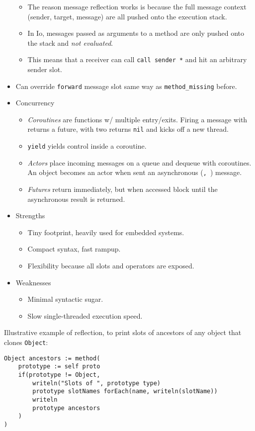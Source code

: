 \documentclass[10pt, twocolumn, landscape]{article}
\begin{document}
\begin{itemize}
\begin{itemize}
            \item The reason message reflection works is because the full
                message context (sender, target, message) are all pushed onto
                the execution stack.
            \item In Io, messages passed as arguments to a method are only
                pushed onto the stack and \emph{not evaluated}.
            \item This means that a receiver can call \texttt{call sender *} and
                hit an arbitrary sender slot.
        \end{itemize}
    \item Can override \texttt{forward} message slot same way as
        \texttt{method\_missing} before.
    \item Concurrency
        \begin{itemize}
            \item \emph{Coroutines} are functions w/ multiple entry/exits. Firing a
                message with \texttt{\@} returns a future, with two
                \texttt{\@\@} returns \texttt{nil} and kicks off a new thread.
            \item \texttt{yield} yields control inside a coroutine.
            \item \emph{Actors} place incoming messages on a queue and dequeue
                with coroutines. An object becomes an actor when sent an
                asynchronous (\texttt{\@, \@\@}) message.
            \item \emph{Futures} return immediately, but when accessed block
                until the asynchronous result is returned.
        \end{itemize}
    \item Strengths
        \begin{itemize}
            \item Tiny footprint, heavily used for embedded systems.
            \item Compact syntax, fast rampup.
            \item Flexibility because all slots and operators are exposed.
        \end{itemize}
    \item Weaknesses
        \begin{itemize}
            \item Minimal syntactic sugar.
            \item Slow single-threaded execution speed.
        \end{itemize}
\end{itemize}

Illustrative example of reflection, to print slots of ancestors of any object
that clones \texttt{Object}:
\begin{lstlisting}
Object ancestors := method(
    prototype := self proto
    if(prototype != Object,
        writeln("Slots of ", prototype type)
        prototype slotNames forEach(name, writeln(slotName))
        writeln
        prototype ancestors
    )
)
\end{lstlisting}
\end{document}

